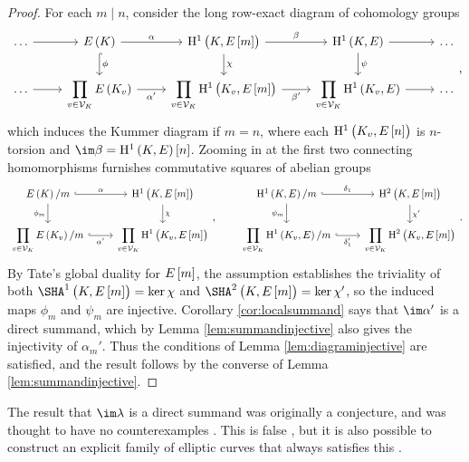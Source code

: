 \begin{proof}
For each $ m \mid n $, consider the long row-exact diagram of cohomology groups
$$
\begin{tikzcd}
\dots \arrow{r} & E\br{K} \arrow{r}{\alpha} \arrow[hookrightarrow]{d}{\phi} & \HE[m]{K} \arrow{r}{\beta} \arrow{d}{\chi} & \HE{K} \arrow{r} \arrow{d}{\psi} & \dots \\
\dots \arrow{r} & \displaystyle\PV E\br{K_v} \arrow{r}[swap]{\alpha'} & \displaystyle\PV\HE[m]{K_v} \arrow{r}[swap]{\beta'} & \displaystyle\PV\HE{K_v} \arrow{r} & \dots
\end{tikzcd},
$$
which induces the Kummer diagram if $ m = n $, where each $ \HE[n]{K_v} $ is $ n $-torsion and $ \im \beta = \HE{K}\sbr{n} $. Zooming in at the first two connecting homomorphisms furnishes commutative squares of abelian groups
$$
\begin{tikzcd}
E\br{K} / m \arrow[hookrightarrow]{r}{\alpha} \arrow{d}[swap]{\phi_m} & \HE[m]{K} \arrow{d}{\chi} \\
\displaystyle\PV E\br{K_v} / m \arrow[hookrightarrow]{r}[swap]{\alpha'} & \displaystyle\PV\HE[m]{K_v}
\end{tikzcd},
\qquad
\begin{tikzcd}
\HE{K} / m \arrow[hookrightarrow]{r}{\delta_1} \arrow{d}[swap]{\psi_m} & \H^2\br{K, E\sbr{m}} \arrow{d}{\chi'} \\
\displaystyle\PV\HE{K_v} / m \arrow[hookrightarrow]{r}[swap]{\delta_1'} & \displaystyle\PV\H^2\br{K_v, E\sbr{m}}
\end{tikzcd}.
$$
By Tate's global duality for $ E\sbr{m} $, the assumption establishes the triviality of both $ \Sha[K, E\sbr{m}] = \ker \chi $ and $ \SHA^2\br{K, E\sbr{m}} = \ker \chi' $, so the induced maps $ \phi_m $ and $ \psi_m $ are injective. Corollary \ref{cor:localsummand} says that $ \im \alpha' $ is a direct summand, which by Lemma \ref{lem:summandinjective} also gives the injectivity of $ \alpha_m' $. Thus the conditions of Lemma \ref{lem:diagraminjective} are satisfied, and the result follows by the converse of Lemma \ref{lem:summandinjective}.
\end{proof}

\pagebreak

\begin{remark}
The result that $ \im \lambda $ is a direct summand was originally a conjecture, and was thought to have no counterexamples \cite[Conjecture 6.9]{BKLPR15}. This is false \cite[Theorem 1.4]{GGGR19}, but it is also possible to construct an explicit family of elliptic curves that always satisfies this \cite[Corollary 1.3]{GGGR19}.
\end{remark}

